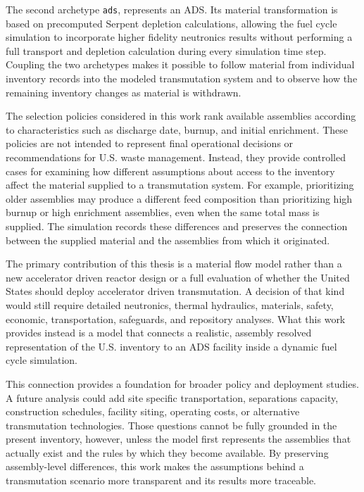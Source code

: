 The second archetype \texttt{ads}, represents an \gls{ADS}. Its material transformation is
based on precomputed Serpent depletion calculations, allowing the
fuel cycle simulation to incorporate higher fidelity neutronics results
without performing a full transport and depletion calculation during every
simulation time step. Coupling the two archetypes makes it possible to follow
material from individual inventory records into the modeled transmutation
system and to observe how the remaining inventory changes as material is
withdrawn.

The selection policies considered in this work rank available assemblies
according to characteristics such as discharge date, burnup, and initial
enrichment. These policies are not intended to represent final operational
decisions or recommendations for U.S. waste management. Instead, they provide
controlled cases for examining how different assumptions about access to the
inventory affect the material supplied to a transmutation system. For
example, prioritizing older assemblies may produce a different feed
composition than prioritizing high burnup or high enrichment assemblies, even
when the same total mass is supplied. The simulation records these
differences and preserves the connection between the supplied material and
the assemblies from which it originated.

The primary contribution of this thesis is a material flow model rather than
a new accelerator driven reactor design or a full evaluation of whether the
United States should deploy accelerator driven transmutation. A decision of
that kind would still require detailed neutronics, thermal hydraulics,
materials, safety, economic, transportation, safeguards, and repository
analyses. What this work provides instead is a model that connects a
realistic, assembly resolved representation of the U.S. inventory to an
\gls{ADS} facility inside a dynamic fuel cycle simulation.

This connection provides a foundation for broader policy and deployment
studies. A future analysis could add site specific transportation,
separations capacity, construction schedules, facility siting, operating
costs, or alternative transmutation technologies. Those questions cannot be
fully grounded in the present inventory, however, unless the model first
represents the assemblies that actually exist and the rules by which they
become available. By preserving assembly-level differences, this work makes
the assumptions behind a transmutation scenario more transparent and its
results more traceable.

